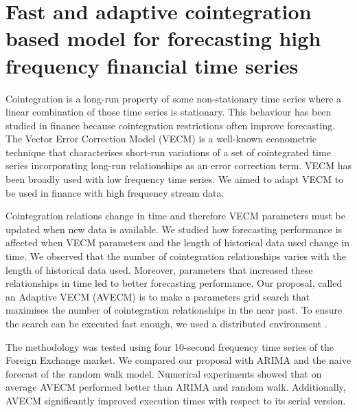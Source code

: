 \chapter{Fast and adaptive cointegration based model
for forecasting high frequency financial time series}

Cointegration is a long-run property of some non-stationary time series where a
linear combination of those time series is stationary.  This behaviour has been
studied in finance because cointegration restrictions often improve forecasting.
The Vector Error Correction Model (VECM) is a well-known econometric technique
that characterises short-run variations of a set of cointegrated time series
incorporating long-run relationships as an error correction term. VECM has been
broadly used with low frequency time series. We aimed to adapt VECM to be used
in finance with high frequency stream data.

Cointegration relations change in time and therefore VECM parameters must be
updated when new data is available. We studied how forecasting performance is
affected when VECM parameters and the length of historical data used change in
time. We observed that the number of cointegration relationships varies with the
length of historical data used. Moreover, parameters that increased these
relationships in time led to better forecasting performance. Our proposal,
called an Adaptive VECM (AVECM) is to make a parameters grid search that
maximises the number of cointegration relationships in the near past. To ensure
the search can be executed fast enough, we used a distributed environment 
\cite{Arce2017}.

The methodology was tested using four 10-second frequency time series of the
Foreign Exchange market. We compared our proposal with ARIMA and the naive
forecast of the random walk model. Numerical experiments showed that on average
AVECM performed better than ARIMA and random walk. Additionally, AVECM
significantly improved execution times with respect to its serial version.


